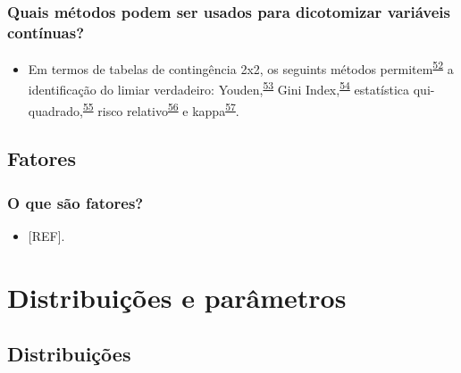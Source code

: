 \documentclass[
]{book}
\providecommand{\tightlist}{%
  \setlength{\itemsep}{0pt}\setlength{\parskip}{0pt}}
\begin{document}
\hypertarget{quais-muxe9todos-podem-ser-usados-para-dicotomizar-variuxe1veis-contuxednuas}{%
\subsection{Quais métodos podem ser usados para dicotomizar variáveis contínuas?}\label{quais-muxe9todos-podem-ser-usados-para-dicotomizar-variuxe1veis-contuxednuas}}

\begin{itemize}
\tightlist
\item
  Em termos de tabelas de contingência 2x2, os seguints métodos permitem\textsuperscript{\protect\hyperlink{ref-Prince2017}{52}} a identificação do limiar verdadeiro: Youden,\textsuperscript{\protect\hyperlink{ref-YOUDEN1950}{53}} Gini Index,\textsuperscript{\protect\hyperlink{ref-strobl2007}{54}} estatística qui-quadrado,\textsuperscript{\protect\hyperlink{ref-pearson1900}{55}} risco relativo\textsuperscript{\protect\hyperlink{ref-Greiner2000}{56}} e kappa\textsuperscript{\protect\hyperlink{ref-fleiss1971}{57}}.
\end{itemize}

\hypertarget{fatores}{%
\section{Fatores}\label{fatores}}

\hypertarget{o-que-suxe3o-fatores}{%
\subsection{O que são fatores?}\label{o-que-suxe3o-fatores}}

\begin{itemize}
\tightlist
\item
  {[}REF{]}.
\end{itemize}

\hypertarget{distribuicoes-parametros}{%
\chapter{\texorpdfstring{\textbf{Distribuições e parâmetros}}{Distribuições e parâmetros}}\label{distribuicoes-parametros}}

\hypertarget{distribuicoes}{%
\section{Distribuições}\label{distribuicoes}}
\end{document}

